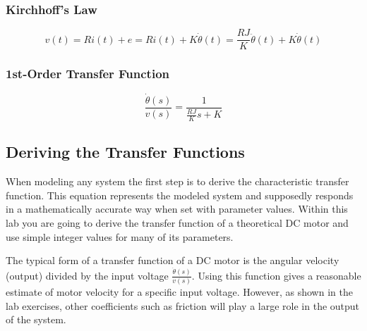 \documentclass[openany,11pt,fleqn]{book} %
\begin{document}
\subsubsection{Kirchhoff's Law}
\begin{equation}
v(t) = Ri(t) + e = Ri(t) + K\dot{\theta}(t) = \frac{RJ}{K}\ddot{\theta}(t)+K\dot{\theta}(t)
\end{equation}

\subsubsection{1st-Order Transfer Function}
\begin{equation}
\frac{\dot{\theta}(s)}{v(s)} = \frac{1}{\frac{RJ}{K}s+K}
\end{equation}


   
\subsection{\color{orange}Deriving the Transfer Functions}
When modeling any system the first step is to derive the characteristic transfer function. This equation represents the modeled system and supposedly responds in a mathematically accurate way when set with parameter values. Within this lab you are going to derive the transfer function of a theoretical DC motor and use simple integer values for many of its parameters. 

The typical form of a transfer function of a DC motor is the angular velocity (output) divided by the input voltage $\frac{\dot{\theta}(s)}{v(s)}$. Using this function gives a reasonable estimate of motor velocity for a specific input voltage. However, as shown in the lab exercises, other coefficients such as friction will play a large role in the output of the system. 
\end{document}
